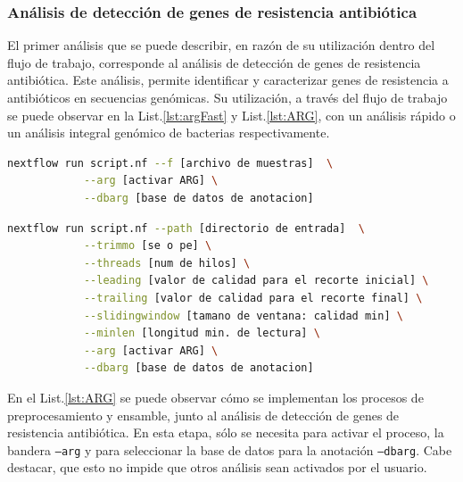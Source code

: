 \documentclass[12pt]{article}
\begin{document}
\subsubsection*{Análisis de detección de genes de resistencia antibiótica}

El primer análisis que se puede describir, en razón de su 
utilización dentro del flujo de trabajo, corresponde al 
análisis de detección de genes de resistencia antibiótica. 
Este análisis, permite identificar y caracterizar genes de 
resistencia a antibióticos en secuencias genómicas. Su 
utilización, a través del flujo de trabajo se puede observar 
en la List.\ref{lst:argFast} y  List.\ref{lst:ARG}, 
con un análisis rápido o un análisis 
integral genómico de bacterias respectivamente. 

\newpage

\begin{center}
    \begin{lstlisting}[language=bash, caption=Comando para ejecutar un análisis rápido de identificación de genes de resistencia antibiótica \emph{(elaboración propia)}., label=lst:argFast]
        nextflow run script.nf --f [archivo de muestras]  \
            --arg [activar ARG] \
            --dbarg [base de datos de anotacion]
    \end{lstlisting}
\end{center}


\begin{center}
    \begin{lstlisting}[language=bash, caption=Comando para la ejecución de un análisis de ARG \emph{(elaboración propia)}., label=lst:ARG]
        nextflow run script.nf --path [directorio de entrada]  \
            --trimmo [se o pe] \
            --threads [num de hilos] \
            --leading [valor de calidad para el recorte inicial] \
            --trailing [valor de calidad para el recorte final] \
            --slidingwindow [tamano de ventana: calidad min] \
            --minlen [longitud min. de lectura] \
            --arg [activar ARG] \
            --dbarg [base de datos de anotacion]
    \end{lstlisting}
\end{center}

En el List.\ref{lst:ARG} se puede observar cómo se implementan los 
procesos de preprocesamiento y ensamble, junto al análisis 
de detección de genes de resistencia antibiótica. En esta 
etapa, sólo se necesita para activar el proceso, la bandera 
\texttt{--arg} y para seleccionar la base de datos para la anotación 
\texttt{--dbarg}. Cabe destacar, que esto no impide que otros análisis 
sean activados por el usuario.
\end{document}
